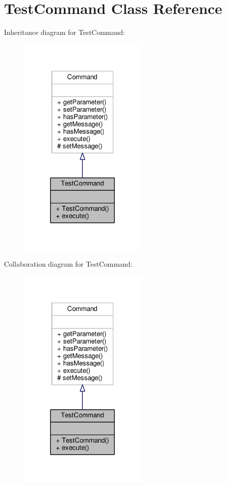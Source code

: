 \hypertarget{classTestCommand}{\section{Test\-Command Class Reference}
\label{classTestCommand}
}


Inheritance diagram for Test\-Command\-:
\nopagebreak
\begin{figure}[H]
\begin{center}
\leavevmode
\includegraphics[width=176pt]{classTestCommand__inherit__graph}
\end{center}
\end{figure}


Collaboration diagram for Test\-Command\-:
\nopagebreak
\begin{figure}[H]
\begin{center}
\leavevmode
\includegraphics[width=176pt]{classTestCommand__coll__graph}
\end{center}
\end{figure}
